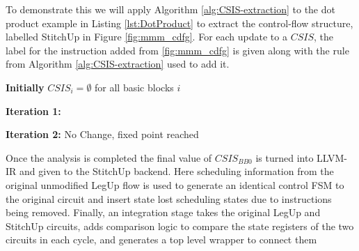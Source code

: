 To demonstrate this we will apply Algorithm \ref{alg:CSIS-extraction} to the
dot product example in Listing \ref{lst:DotProduct} to extract the control-flow structure, 
labelled StitchUp in Figure \ref{fig:mmm_cdfg}. 
For each update to a $\mathit{CSIS}$, the label for the instruction added from \ref{fig:mmm_cdfg} is given 
along with the rule from Algorithm \ref{alg:CSIS-extraction} used to add it. 

\vspace{1mm}
\noindent
\textbf{Initially} $\mathit{CSIS}_{i} = \emptyset$ for all basic blocks $i$

\vspace{-2mm}
\noindent
\hrulefill

\vspace{-1mm}
\noindent
\textbf{Iteration 1:}


\vspace{1mm}
\noindent
\textbf{Iteration 2:}\hspace{3mm} No Change, fixed point reached

\vspace{1mm}

Once the analysis is completed the final value of $\mathit{CSIS}_{\mathit{BB0}}$ is turned into LLVM-IR
and given to the StitchUp backend.
Here scheduling information from the original unmodified LegUp flow is used to generate
an identical control FSM to the original circuit and insert state lost scheduling states
due to instructions being removed. 
Finally, an integration stage takes the original LegUp and StitchUp circuits,
adds comparison logic to compare the state registers of the two circuits in each cycle,
and generates a top level wrapper to connect them
